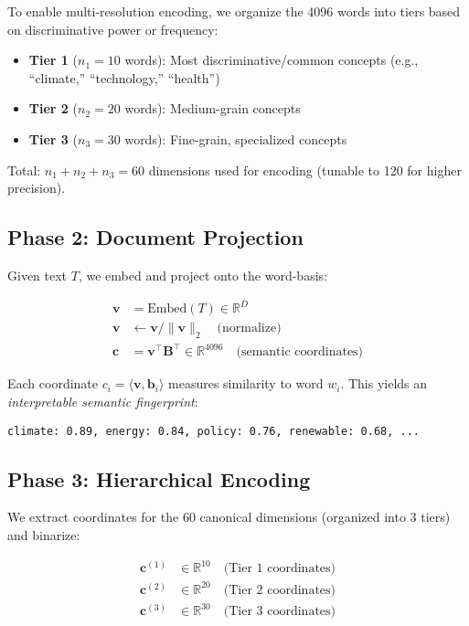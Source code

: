 \documentclass[11pt]{article}
\begin{document}
To enable multi-resolution encoding, we organize the 4096 words into tiers based on discriminative power or frequency:

\begin{itemize}
  \item \textbf{Tier 1} ($n_1 = 10$ words): Most discriminative/common concepts (e.g., ``climate,'' ``technology,'' ``health'')
  \item \textbf{Tier 2} ($n_2 = 20$ words): Medium-grain concepts
  \item \textbf{Tier 3} ($n_3 = 30$ words): Fine-grain, specialized concepts
\end{itemize}

Total: $n_1 + n_2 + n_3 = 60$ dimensions used for encoding (tunable to 120 for higher precision).

\subsection{Phase 2: Document Projection}

Given text $T$, we embed and project onto the word-basis:

\begin{align}
\mathbf{v} &= \text{Embed}(T) \in \mathbb{R}^D \\
\mathbf{v} &\gets \mathbf{v} / \|\mathbf{v}\|_2 \quad \text{(normalize)} \\
\mathbf{c} &= \mathbf{v}^\top \mathbf{B}^\top \in \mathbb{R}^{4096} \quad \text{(semantic coordinates)}
\end{align}

Each coordinate $c_i = \langle \mathbf{v}, \mathbf{b}_i \rangle$ measures similarity to word $w_i$. This yields an \emph{interpretable semantic fingerprint}:

\begin{verbatim}
climate: 0.89, energy: 0.84, policy: 0.76, renewable: 0.68, ...
\end{verbatim}

\subsection{Phase 3: Hierarchical Encoding}

We extract coordinates for the 60 canonical dimensions (organized into 3 tiers) and binarize:

\begin{align}
\mathbf{c}^{(1)} &\in \mathbb{R}^{10} \quad \text{(Tier 1 coordinates)} \\
\mathbf{c}^{(2)} &\in \mathbb{R}^{20} \quad \text{(Tier 2 coordinates)} \\
\mathbf{c}^{(3)} &\in \mathbb{R}^{30} \quad \text{(Tier 3 coordinates)}
\end{align}
\end{document}

